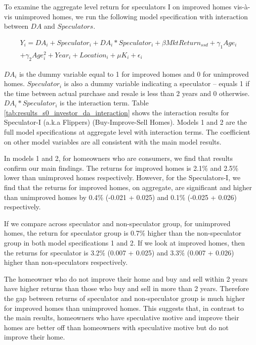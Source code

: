 \documentclass[AEJ,reqno, draftmode]{AEA} %
\begin{document}
To examine the aggregate level return for speculators I on improved homes vis-à-vis unimproved homes, we run the following model specification with interaction between $DA$ and $Speculators$. 

\begin{equation} \label{eq: spec I}
\begin{aligned}
    Y_i = DA_i + Speculator_i + DA_i * Speculator_i + \beta{MktReturn_{ssd}} + \gamma_1{Age_i}\\ + \gamma_2{Age_i^2} + Year_i + Location_i + \mu{K_i} + \epsilon_i
\end{aligned}
\end{equation}

$DA_i$ is the dummy variable equal to 1 for improved homes and 0 for unimproved homes. $Speculator_i$ is also a dummy variable indicating a speculator -- equals 1 if the time between actual purchase and resale is less than 2 years and 0 otherwise. $DA_i*Speculator_i$ is the interaction term. Table \ref{tab:results_s0_investor_da_interaction} shows the interaction results for Speculator-I (a.k.a Flippers) (Buy-Improve-Sell Homes). Models 1 and 2 are the full model specifications at aggregate level with interaction terms. The coefficient on other model variables are all consistent with the main model results.

In models 1 and 2, for homeowners who are consumers, we find that results confirm our main findings. The returns for improved homes is 2.1\% and 2.5\% lower than unimproved homes respectively. However, for the Speculators-I, we find that the returns for improved homes, on aggregate, are significant and higher than unimproved homes by 0.4\% (-0.021 + 0.025) and 0.1\% (-0.025 + 0.026) respectively.



\restoregeometry


If we compare across speculator and non-speculator group, for unimproved homes, the return for speculator group is 0.7\% higher than the non-speculator group in both model specifications 1 and 2. If we look at improved homes, then the returns for speculator is 3.2\% (0.007 + 0.025) and 3.3\% (0.007 + 0.026) higher than non-speculators respectively.

The homeowner who do not improve their home and buy and sell within 2 years have higher returns than those who buy and sell in more than 2 years. Therefore the gap between returns of speculator and non-speculator group is much higher for improved homes than unimproved homes. This suggests that, in contrast to the main results, homeowners who have speculative motive and improve their homes are better off than homeowners with speculative motive but do not improve their home.
\end{document}
